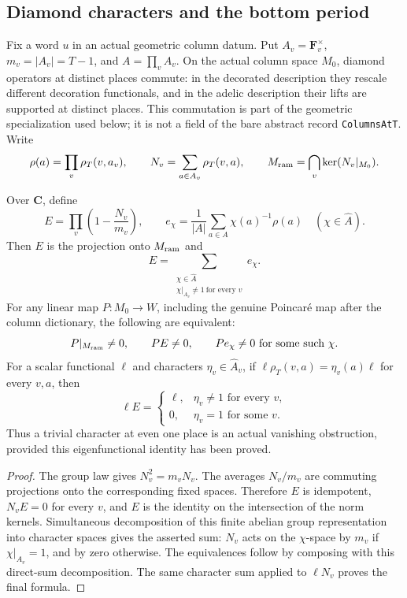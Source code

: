 \subsection{Diamond characters and the bottom period}
\label{sec:diamond-fourier-anchor}

Fix a word $u$ in an actual geometric column datum.  Put
$A_v=\mathbf F_v^{\times}$, $m_v=|A_v|=T-1$, and
$A=\prod_v A_v$.  On the actual column space $M_0$, diamond operators
at distinct places commute: in the decorated description they rescale
different decoration functionals, and in the adelic description their
lifts are supported at distinct places.  This commutation is part of
the geometric specialization used below; it is not a field of the
bare abstract record \texttt{ColumnsAtT}.  Write
\[
 \rho(a)=\prod_v\rho_T(v,a_v),\qquad
 N_v=\sum_{a\in A_v}\rho_T(v,a),\qquad
 M_{\rm ram}=\bigcap_v\ker(N_v|_{M_0}).
\]

\begin{proposition}
\label{prop:diamond-fourier-test}
Over $\mathbf C$, define
\[
 E=\prod_v\left(1-\frac{N_v}{m_v}\right),\qquad
 e_\chi=\frac1{|A|}\sum_{a\in A}\chi(a)^{-1}\rho(a)
 \quad(\chi\in\widehat A).
\]
Then $E$ is the projection onto $M_{\rm ram}$ and
\[
 E=\sum_{\substack{\chi\in\widehat A\\
                  \chi|_{A_v}\ne1\ \text{for every }v}}e_\chi.
\]
For any linear map $P:M_0\to W$, including the genuine
Poincar\'e map after the column dictionary, the following are
equivalent:
\[
 P|_{M_{\rm ram}}\ne0,
 \qquad PE\ne0,
 \qquad Pe_\chi\ne0\text{ for some such }\chi.
\]
For a scalar functional $\ell$ and characters $\eta_v\in\widehat A_v$, if
$\ell\rho_T(v,a)=\eta_v(a)\ell$ for every $v,a$, then
\[
 \ell E=
 \begin{cases}
 \ell,&\eta_v\ne1\text{ for every }v,\\
 0,&\eta_v=1\text{ for some }v.
 \end{cases}
\]
Thus a trivial character at even one place is an actual vanishing
obstruction, provided this eigenfunctional identity has been proved.
\end{proposition}
\begin{proof}
The group law gives $N_v^2=m_vN_v$.  The averages $N_v/m_v$ are
commuting projections onto the corresponding fixed spaces.  Therefore
$E$ is idempotent, $N_vE=0$ for every $v$, and $E$ is the identity
on the intersection of the norm kernels.  Simultaneous decomposition
of this finite abelian group representation into character spaces
gives the asserted sum: $N_v$ acts on the $\chi$-space by $m_v$
if $\chi|_{A_v}=1$, and by zero otherwise.  The equivalences follow
by composing with this direct-sum decomposition.  The same character
sum applied to $\ell N_v$ proves the final formula.
\end{proof}

